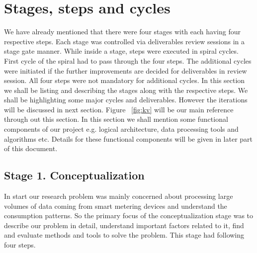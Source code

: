 \section{Stages, steps and cycles}\label{stages} 
We have already mentioned that there were four stages with each having four respective steps. Each stage was controlled via deliverables review sessions in a stage gate manner. While inside a stage, steps were executed in spiral cycles. First cycle of the spiral had to pass through the four steps. The additional cycles were initiated if the further improvements are decided for deliverables in review session. All four steps were not mandatory for additional cycles. In this section we shall be listing and describing the stages along with the respective steps. We shall be highlighting some major cycles and deliverables. However the iterations will be discussed in next section. Figure ~\ref{fig:kv} will be our main reference through out this section. In this section we shall mention some functional components of our project e.g. logical architecture, data processing tools and algorithms etc. Details for these functional components will be given in later part of this document.
\subsection{Stage 1. Conceptualization } \label{concept}
In start our research problem was mainly concerned about processing large volumes of data coming from smart metering devices and understand the consumption patterns. So the primary focus of the conceptualization stage was to describe our problem in detail, understand important factors related to it, find and evaluate methods and tools to solve the problem. This stage had following four steps.
